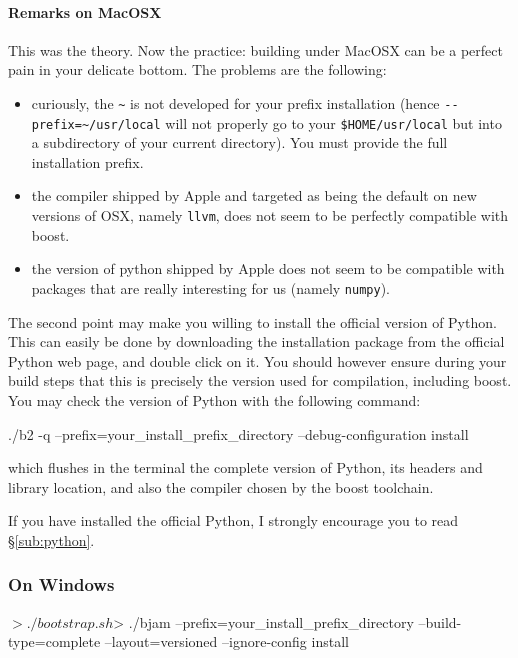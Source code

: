 \paragraph{Remarks on MacOSX}
This was the theory. Now the practice: building under MacOSX can be a perfect pain in your delicate bottom. The problems are the following:
\begin{itemize}
\item curiously, the \lstinline|~| is not developed for your prefix installation (hence \lstinline|--prefix=~/usr/local| will not properly go to your \lstinline|$HOME/usr/local| but into a subdirectory of your current directory). You must provide the full installation prefix.
\item the compiler shipped by Apple and targeted as being the default on new versions of OSX, namely \lstinline|llvm|, does not seem to be perfectly compatible with boost. 
\item the version of python shipped by Apple does not seem to be compatible with packages that are really interesting for us (namely \lstinline|numpy|). 
\end{itemize}

The second point may make you willing to install the official version of Python. This can easily be done by downloading the installation package from the official Python web page, and double click on it. You should however ensure during your build steps that this is precisely the version used for compilation, including boost. You may check the version of Python with the following command:

\begin{bash}
./b2 -q  --prefix=your_install_prefix_directory --debug-configuration install
\end{bash}

which flushes in the terminal the complete version of Python, its headers and library location, and also the compiler chosen by the boost toolchain. 

If you have installed the official Python, I strongly encourage you to read \S \ref{sub:python}. 




\subsubsection{On Windows}
\begin{bash}
$> ./bootstrap.sh
$> ./bjam --prefix=your_install_prefix_directory --build-type=complete --layout=versioned --ignore-config install
\end{bash}

